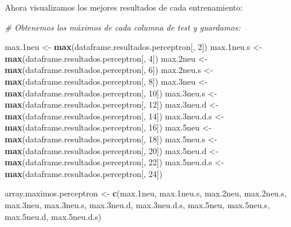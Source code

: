 \documentclass[]{article}
\newenvironment{Shaded}{\begin{snugshade}}{\end{snugshade}}
\newcommand{\CommentTok}[1]{\textcolor[rgb]{0.56,0.35,0.01}{\textit{#1}}}
\newcommand{\DecValTok}[1]{\textcolor[rgb]{0.00,0.00,0.81}{#1}}
\newcommand{\FloatTok}[1]{\textcolor[rgb]{0.00,0.00,0.81}{#1}}
\newcommand{\KeywordTok}[1]{\textcolor[rgb]{0.13,0.29,0.53}{\textbf{#1}}}
\newcommand{\NormalTok}[1]{#1}
\newcommand{\StringTok}[1]{\textcolor[rgb]{0.31,0.60,0.02}{#1}}
\begin{document}
Ahora visualizamos los mejores resultados de cada entrenamiento:

\begin{Shaded}
\begin{Highlighting}[]
\CommentTok{# Obtenemos los máximos de cada columna de test y guardamos:}

\NormalTok{max}\FloatTok{.1}\NormalTok{neu <-}\StringTok{ }\KeywordTok{max}\NormalTok{(dataframe.resultados.perceptron[, }\DecValTok{2}\NormalTok{])}
\NormalTok{max}\FloatTok{.1}\NormalTok{neu.s <-}\StringTok{ }\KeywordTok{max}\NormalTok{(dataframe.resultados.perceptron[, }\DecValTok{4}\NormalTok{])}
\NormalTok{max}\FloatTok{.2}\NormalTok{neu <-}\StringTok{ }\KeywordTok{max}\NormalTok{(dataframe.resultados.perceptron[, }\DecValTok{6}\NormalTok{])}
\NormalTok{max}\FloatTok{.2}\NormalTok{neu.s <-}\StringTok{ }\KeywordTok{max}\NormalTok{(dataframe.resultados.perceptron[, }\DecValTok{8}\NormalTok{])}
\NormalTok{max}\FloatTok{.3}\NormalTok{neu <-}\StringTok{ }\KeywordTok{max}\NormalTok{(dataframe.resultados.perceptron[, }\DecValTok{10}\NormalTok{])}
\NormalTok{max}\FloatTok{.3}\NormalTok{neu.s <-}\StringTok{ }\KeywordTok{max}\NormalTok{(dataframe.resultados.perceptron[, }\DecValTok{12}\NormalTok{])}
\NormalTok{max}\FloatTok{.3}\NormalTok{neu.d <-}\StringTok{ }\KeywordTok{max}\NormalTok{(dataframe.resultados.perceptron[, }\DecValTok{14}\NormalTok{])}
\NormalTok{max}\FloatTok{.3}\NormalTok{neu.d.s <-}\StringTok{ }\KeywordTok{max}\NormalTok{(dataframe.resultados.perceptron[, }\DecValTok{16}\NormalTok{])}
\NormalTok{max}\FloatTok{.5}\NormalTok{neu <-}\StringTok{ }\KeywordTok{max}\NormalTok{(dataframe.resultados.perceptron[, }\DecValTok{18}\NormalTok{])}
\NormalTok{max}\FloatTok{.5}\NormalTok{neu.s <-}\StringTok{ }\KeywordTok{max}\NormalTok{(dataframe.resultados.perceptron[, }\DecValTok{20}\NormalTok{])}
\NormalTok{max}\FloatTok{.5}\NormalTok{neu.d <-}\StringTok{ }\KeywordTok{max}\NormalTok{(dataframe.resultados.perceptron[, }\DecValTok{22}\NormalTok{])}
\NormalTok{max}\FloatTok{.5}\NormalTok{neu.d.s <-}\StringTok{ }\KeywordTok{max}\NormalTok{(dataframe.resultados.perceptron[, }\DecValTok{24}\NormalTok{])}

\NormalTok{array.maximos.perceptron <-}\StringTok{ }\KeywordTok{c}\NormalTok{(max}\FloatTok{.1}\NormalTok{neu, }
\NormalTok{                              max}\FloatTok{.1}\NormalTok{neu.s, }
\NormalTok{                              max}\FloatTok{.2}\NormalTok{neu,}
\NormalTok{                              max}\FloatTok{.2}\NormalTok{neu.s,}
\NormalTok{                              max}\FloatTok{.3}\NormalTok{neu,}
\NormalTok{                              max}\FloatTok{.3}\NormalTok{neu.s,}
\NormalTok{                              max}\FloatTok{.3}\NormalTok{neu.d, }
\NormalTok{                              max}\FloatTok{.3}\NormalTok{neu.d.s, }
\NormalTok{                              max}\FloatTok{.5}\NormalTok{neu, }
\NormalTok{                              max}\FloatTok{.5}\NormalTok{neu.s, }
\NormalTok{                              max}\FloatTok{.5}\NormalTok{neu.d, }
\NormalTok{                              max}\FloatTok{.5}\NormalTok{neu.d.s)}


\end{Highlighting}
\end{Shaded}
\end{document}
